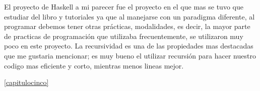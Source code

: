 \documentclass[12pt]{report}
\begin{document}
El proyecto de Haskell a mi parecer fue el proyecto en el que mas se tuvo que estudiar del libro y tutoriales ya que al manejarse con un paradigma diferente, al programar debemos tener otras prácticas, modalidades, es decir, la mayor parte de practicas de programación que utilizaba frecuentemente, se utilizaron muy poco en este proyecto.
La recursividad es una de las propiedades mas destacadas que me gustaria mencionar; es muy bueno el utilizar recursión para hacer nuestro codigo mas eficiente y corto, mientras menos lineas mejor.



 \ref{capitulocinco}
\end{document}
